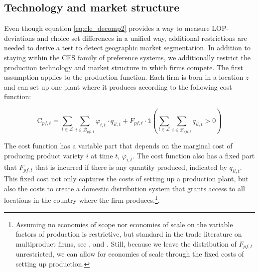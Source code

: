 \subsection{Technology and market structure}
Even though equation \ref{eq:cle_decomp2} provides a way to measure LOP-deviations and choice set differences in a unified way, additional restrictions are needed to derive a test to detect geographic market segmentation. In addition to staying within the CES family of preference systems, we additionally restrict the production technology and market structure in which firms compete. The first assumption applies to the production function. Each firm is born in a location $z$ and can set up one plant where it produces according to the following cost function: 
\begin{linenomath*}
    \begin{equation*}
        \text{C}_{pf,t} = 
            \sum_{l \in \mathcal{L}}\sum_{i \in \mathcal{B}_{pfl,t}}\varphi_{i,t}\cdot q_{il,t} 
                +   F_{pf,t}\cdot
                    \mathbb{1}\left(\sum_{l \in \mathcal{L}}\sum_{i \in \mathcal{B}_{pfl,t}}q_{il,t}>0\right)
    \end{equation*}
\end{linenomath*}
The cost function has a variable part that depends on the marginal cost of producing product variety $i$ at time $t$, $\varphi_{i,t}$. The cost function also has a fixed part that $F_{pf,t}$ that is incurred if there is any quantity produced, indicated by $q_{il,t}$. This fixed cost not only captures the costs of setting up a production plant, but also the costs to create a domestic distribution system that grants access to all locations in the country where the firm produces.\footnote{Assuming no economies of scope nor economies of scale on the variable factors of production is restrictive, but standard in the trade literature on multiproduct firms, see \citet{Eckel2010}, \citet{Bernard2011} and \citet{Mayer2014}. Still, because we leave the distribution of $F_{pf,t}$ unrestricted, we can allow for economies of scale through the fixed costs of setting up production.}. 

